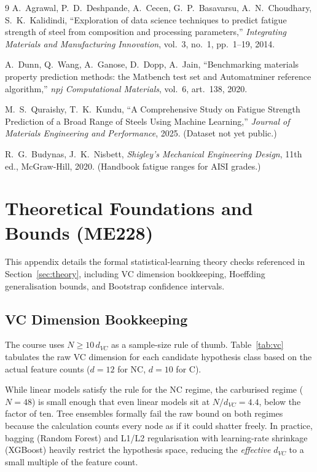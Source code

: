 \documentclass[12pt,a4paper]{article}
\begin{document}
\begin{thebibliography}{9}
  A.~Agrawal, P.~D.~Deshpande, A.~Cecen, G.~P.~Basavarsu, A.~N.~Choudhary, S.~K.~Kalidindi,
  ``Exploration of data science techniques to predict fatigue strength of steel from composition
  and processing parameters,''
  \textit{Integrating Materials and Manufacturing Innovation}, vol.~3, no.~1, pp.~1--19, 2014.

  A.~Dunn, Q.~Wang, A.~Ganose, D.~Dopp, A.~Jain, ``Benchmarking materials property prediction
  methods: the Matbench test set and Automatminer reference algorithm,''
  \textit{npj Computational Materials}, vol.~6, art.~138, 2020.

  M.~S.~Quraishy, T.~K.~Kundu, ``A Comprehensive Study on Fatigue Strength Prediction of a
  Broad Range of Steels Using Machine Learning,''
  \textit{Journal of Materials Engineering and Performance}, 2025. (Dataset not yet public.)

  R.~G.~Budynas, J.~K.~Nisbett, \textit{Shigley's Mechanical Engineering Design}, 11th ed.,
  McGraw-Hill, 2020. (Handbook fatigue ranges for AISI grades.)
\end{thebibliography}

\section{Theoretical Foundations and Bounds (ME228)}\label{app:theory}

This appendix details the formal statistical-learning theory checks referenced in Section~\ref{sec:theory}, including VC dimension bookkeeping, Hoeffding generalisation bounds, and Bootstrap confidence intervals.

\subsection{VC Dimension Bookkeeping}

The course uses $N \geq 10\,d_{VC}$ as a sample-size rule of thumb. Table~\ref{tab:vc} tabulates the raw VC dimension for each candidate hypothesis class based on the actual feature counts ($d=12$ for NC, $d=10$ for C). 

While linear models satisfy the rule for the NC regime, the carburised regime ($N=48$) is small enough that even linear models sit at $N/d_{VC} = 4.4$, below the factor of ten. Tree ensembles formally fail the raw bound on both regimes because the calculation counts every node as if it could shatter freely. In practice, bagging (Random Forest) and L1/L2 regularisation with learning-rate shrinkage (XGBoost) heavily restrict the hypothesis space, reducing the \emph{effective} $d_{VC}$ to a small multiple of the feature count.
\end{document}
